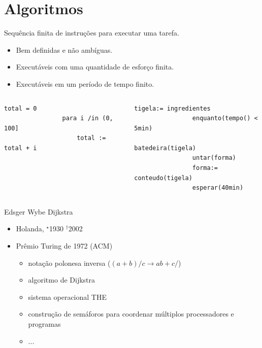 \section{Algoritmos}
\begin{frame}[fragile,label=main]
	\begin{block}{}
		Sequência finita de instruções para executar uma tarefa.
		\begin{itemize}
			\item Bem definidas e não ambíguas.
			\item Executáveis com uma quantidade de esforço finita.
			\item Executáveis em um período de tempo finito.
		\end{itemize}
	\end{block}
	\vfill\pause
	\begin{columns}[T]\small
			\begin{lstlisting}[title=Soma Sequencial]
				total = 0
				para i /in (0, 100]
				    total := total + i
			\end{lstlisting}
		\pause
			\begin{lstlisting}[title=Bolo,morekeywords={tempo,batedeira,untar,esperar,conteudo}]
				tigela:= ingredientes
				enquanto(tempo() < 5min)
				    batedeira(tigela)
				untar(forma)
				forma:= conteudo(tigela)
				esperar(40min)
			\end{lstlisting}
	\end{columns}
\end{frame}

\begin{frame}[label=graduacao]
	Edsger Wybe \alert{Dijkstra}
	\begin{itemize}
		\item Holanda, $^{\star}$1930 $^{\dagger}$2002
		\item Prêmio Turing de 1972 (ACM)
			\begin{itemize}
				\item notação polonesa inversa  ($(a+b)/c \rightarrow a b + c /$)
				\item algoritmo de Dijkstra
				\item sistema operacional THE
				\item construção de semáforos para coordenar múltiplos processadores e programas
				\item ...
			\end{itemize}
	\end{itemize}
	\pause
\end{frame}

